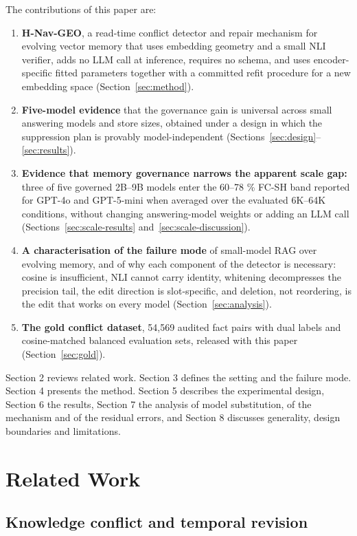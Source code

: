 \documentclass[journal=jcisd8,manuscript=article]{achemso}
\begin{document}
The contributions of this paper are:
\begin{enumerate}
  \item \textbf{H-Nav-GEO}, a read-time conflict detector and repair mechanism for evolving vector memory that uses embedding geometry and a small NLI verifier, adds no LLM call at inference, requires no schema, and uses encoder-specific fitted parameters together with a committed refit procedure for a new embedding space (Section~\ref{sec:method}).
  \item \textbf{Five-model evidence} that the governance gain is universal across small answering models and store sizes, obtained under a design in which the suppression plan is provably model-independent (Sections~\ref{sec:design}--\ref{sec:results}).
  \item \textbf{Evidence that memory governance narrows the apparent scale gap:} three of five    governed 2B--9B models enter the 60--78 \% FC-SH band reported for GPT-4o and    GPT-5-mini when averaged over the evaluated 6K--64K conditions, without changing    answering-model weights or adding an LLM call (Sections~\ref{sec:scale-results} and~\ref{sec:scale-discussion}).
  \item \textbf{A characterisation of the failure mode} of small-model RAG over evolving memory, and of why each component of the detector is necessary: cosine is insufficient, NLI cannot carry identity, whitening decompresses the precision tail, the edit direction is slot-specific, and deletion, not reordering, is the edit that works on every model (Section~\ref{sec:analysis}).
  \item \textbf{The gold conflict dataset}, 54,569 audited fact pairs with dual labels and cosine-matched balanced evaluation sets, released with this paper (Section~\ref{sec:gold}).
\end{enumerate}

Section 2 reviews related work. Section 3 defines the setting and the failure mode. Section 4 presents the method. Section 5 describes the experimental design, Section 6 the results, Section 7 the analysis of model substitution, of the mechanism and of the residual errors, and Section 8 discusses generality, design boundaries and limitations.

\section{Related Work}
\label{sec:related}

\subsection{Knowledge conflict and temporal revision}
\end{document}
